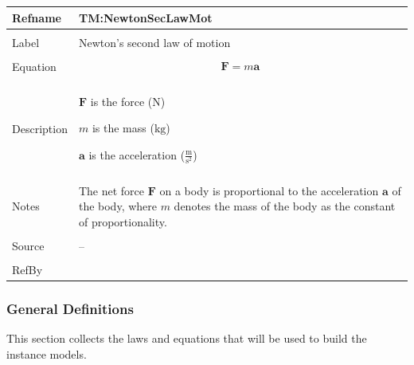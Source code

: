 \documentclass[12pt]{article}
\begin{document}
\begin{minipage}{\textwidth}
\begin{tabular}{>{\raggedright}p{}>{\raggedright\arraybackslash}p{}}
\toprule \textbf{Refname} & \textbf{TM:NewtonSecLawMot}
\label{TM:NewtonSecLawMot}
\\ \midrule \\
Label & Newton's second law of motion
        
\\ \midrule \\
Equation & \begin{displaymath}
           \mathbf{F}=m \mathbf{a}
           \end{displaymath}
\\ \midrule \\
Description & \begin{symbDescription}
              \item{$\mathbf{F}$ is the force (${\text{N}}$)}
              \item{$m$ is the mass (${\text{kg}}$)}
              \item{$\mathbf{a}$ is the acceleration ($\frac{\text{m}}{\text{s}^{2}}$)}
              \end{symbDescription}
\\ \midrule \\
Notes & The net force $\mathbf{F}$ on a body is proportional to the acceleration $\mathbf{a}$ of the body, where $m$ denotes the mass of the body as the constant of proportionality.
        
\\ \midrule \\
Source & --
         
\\ \midrule \\
RefBy & 
\\ \bottomrule
\end{tabular}
\end{minipage}
\subsubsection{General Definitions}
\label{Sec:GDs}
This section collects the laws and equations that will be used to build the instance models.
\end{document}
